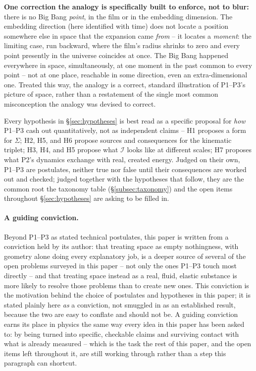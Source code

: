 \documentclass[12pt, a4paper]{article}
\begin{document}
\textbf{One correction the analogy is specifically built to enforce,
not to blur:} there is no Big Bang \emph{point}, in the film or in the
embedding dimension. The embedding direction (here identified with
time) does not locate a position somewhere else in space that the
expansion came \emph{from} -- it locates a \emph{moment}: the limiting
case, run backward, where the film's radius shrinks to zero and every
point presently in the universe coincides at once. The Big Bang
happened everywhere in space, simultaneously, at one moment in the
past common to every point -- not at one place, reachable in some
direction, even an extra-dimensional one. Treated this way, the
analogy is a correct, standard illustration of P1--P3's picture of
space, rather than a restatement of the single most common
misconception the analogy was devised to correct.

Every hypothesis in \S\ref{sec:hypotheses} is best read as a specific
proposal for \emph{how} P1--P3 cash out quantitatively, not as
independent claims -- H1 proposes a form for $\Sigma$; H2, H5, and H6
propose sources and consequences for the kinematic triplet; H3, H4,
and H5 propose what $\mathcal{I}$ looks like at different scales; H7
proposes what P2's dynamics exchange with real, created energy. Judged
on their own, P1--P3 are postulates, neither true nor false until
their consequences are worked out and checked; judged together with
the hypotheses that follow, they are the common root the taxonomy
table (\S\ref{subsec:taxonomy}) and the open items throughout
\S\ref{sec:hypotheses} are asking to be filled in.

\paragraph{A guiding conviction.}
Beyond P1--P3 as stated technical postulates, this paper is written
from a conviction held by its author: that treating space as empty
nothingness, with geometry alone doing every explanatory job, is a
deeper source of several of the open problems surveyed in this paper
-- not only the ones P1--P3 touch most directly -- and that treating
space instead as a real, fluid, elastic substance is more likely to
resolve those problems than to create new ones. This conviction is
the motivation behind the choice of postulates and hypotheses in this
paper; it is stated plainly here \emph{as} a conviction, not smuggled
in as an established result, because the two are easy to conflate and
should not be. A guiding conviction earns its place in physics the
same way every idea in this paper has been asked to: by being turned
into specific, checkable claims and surviving contact with what is
already measured -- which is the task the rest of this paper, and the
open items left throughout it, are still working through rather than
a step this paragraph can shortcut.
\end{document}
